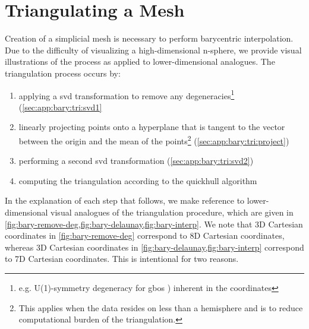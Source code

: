 \documentclass[final,12pt]{elsarticle}
\begin{document}
%
%
\section{Triangulating a Mesh}
\label{sec:app:bary:tri}

Creation of a simplicial mesh is necessary to perform barycentric interpolation. Due to the difficulty of visualizing a high-dimensional n-sphere, we provide visual illustrations of the process as applied to lower-dimensional analogues. The triangulation process occurs by:
\begin{enumerate}%
	\item[1.1] applying a \gls{svd} transformation to remove any degeneracies\footnote{e.g. U(1)-symmetry degeneracy for \glspl{gbo} \cite{francisGeodesicOctonionMetric2019}) inherent in the coordinates} (\cref{sec:app:bary:tri:svd1}
	\item[1.2] linearly projecting points onto a hyperplane that is tangent to the vector between the origin and the mean of the \inpt{} points\footnote{This applies when the data resides on less than a hemisphere and is to reduce computational burden of the triangulation. } (\cref{sec:app:bary:tri:project})
	\item[1.3] performing a second \gls{svd} transformation (\cref{sec:app:bary:tri:svd2})
	\item[1.4] computing the triangulation according to the quickhull algorithm \cite{barberQuickhullAlgorithmConvex1996}
\end{enumerate}

In the explanation of each step that follows, we make reference to lower-dimensional visual analogues of the triangulation procedure, which are given in \cref{fig:bary-remove-deg,fig:bary-delaunay,fig:bary-interp}. We note that 3D Cartesian coordinates in \cref{fig:bary-remove-deg} correspond to 8D Cartesian coordinates, whereas 3D Cartesian coordinates in \cref{fig:bary-delaunay,fig:bary-interp} correspond to 7D Cartesian coordinates. This is intentional for two reasons.
\end{document}
